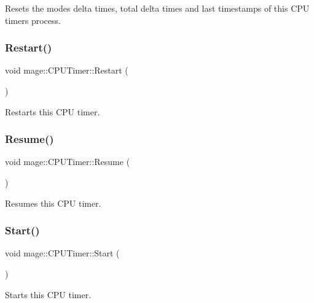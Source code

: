 Resets the modes\textquotesingle{} delta times, total delta times and last timestamps of this C\+PU timer\textquotesingle{}s process. \hypertarget{classmage_1_1_c_p_u_timer_af9668358f3a1d6db3e0f1f608d269ec8}{}\label{classmage_1_1_c_p_u_timer_af9668358f3a1d6db3e0f1f608d269ec8} 
\subsubsection{\texorpdfstring{Restart()}{Restart()}}
{\footnotesize\ttfamily void mage\+::\+C\+P\+U\+Timer\+::\+Restart (\begin{DoxyParamCaption}{ }\end{DoxyParamCaption})}

Restarts this C\+PU timer. \hypertarget{classmage_1_1_c_p_u_timer_ae82cf4b83a4968e24ef49961745acd79}{}\label{classmage_1_1_c_p_u_timer_ae82cf4b83a4968e24ef49961745acd79} 
\subsubsection{\texorpdfstring{Resume()}{Resume()}}
{\footnotesize\ttfamily void mage\+::\+C\+P\+U\+Timer\+::\+Resume (\begin{DoxyParamCaption}{ }\end{DoxyParamCaption})}

Resumes this C\+PU timer. \hypertarget{classmage_1_1_c_p_u_timer_aa6ee4ede4066d447f4205d51bd0b8442}{}\label{classmage_1_1_c_p_u_timer_aa6ee4ede4066d447f4205d51bd0b8442} 
\subsubsection{\texorpdfstring{Start()}{Start()}}
{\footnotesize\ttfamily void mage\+::\+C\+P\+U\+Timer\+::\+Start (\begin{DoxyParamCaption}{ }\end{DoxyParamCaption})}

Starts this C\+PU timer. \hypertarget{classmage_1_1_c_p_u_timer_a2fb7ae3c902fc590f48ed1c56e1cc447}{}\label{classmage_1_1_c_p_u_timer_a2fb7ae3c902fc590f48ed1c56e1cc447} 
